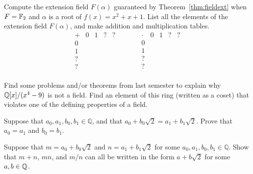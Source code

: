 \begin{problem}
    Compute the extension field $F(\alpha)$ guaranteed by Theorem~\ref{thm:fieldext} when $F = \mathbb{F}_2$ and $\alpha$ is a root of $f(x)=x^2+x+1$. List all the elements of the extension field $F(\alpha)$, and make addition and multiplication tables.
\[
\begin{array}{c|cccc}
+   & 0   & 1  & ? & ? \\ \hline
0   &     &    &   &   \\
1   &     &    &   &   \\
?   &     &    &   &   \\
?   &     &    &   &   \\
\end{array}
\quad\quad\quad
\begin{array}{c|cccc}
\cdot & 0   & 1  & ? & ? \\ \hline
0     &     &    &   &   \\
1     &     &    &   &   \\
?     &     &    &   &   \\
?     &     &    &   &   \\
\end{array}
\]
\end{problem}

\begin{problem}
    Find some problems and/or theorems from last semester to explain why $\mathbb{Q}[x]/(x^4-9)$ is not a field. Find an element of this ring (written as a coset) that violates one of the defining properties of a field.
\end{problem}

\begin{problem}\label{prob:root2a}
Suppose that $a_0, a_1, b_0, b_1 \in \mathbb{Q}$, and that $a_0 + b_0\sqrt{2} = a_1+b_1\sqrt{2}$.  Prove that $a_0 = a_1$ and $b_0 = b_1$.
\begin{annotation}
\end{annotation}
\end{problem}

\begin{problem}\label{prob:root2b}
Suppose that $m = a_0 + b_0\sqrt{2}$ and $n =a_1+b_1\sqrt{2}$ for some $a_0, a_1, b_0, b_1 \in \mathbb{Q}$. Show that $m+n$, $mn$, and $m/n$ can all be written in the form $a + b\sqrt{2}$ for some $a,b \in \mathbb{Q}$.
\begin{annotation}
\end{annotation}
\end{problem}

